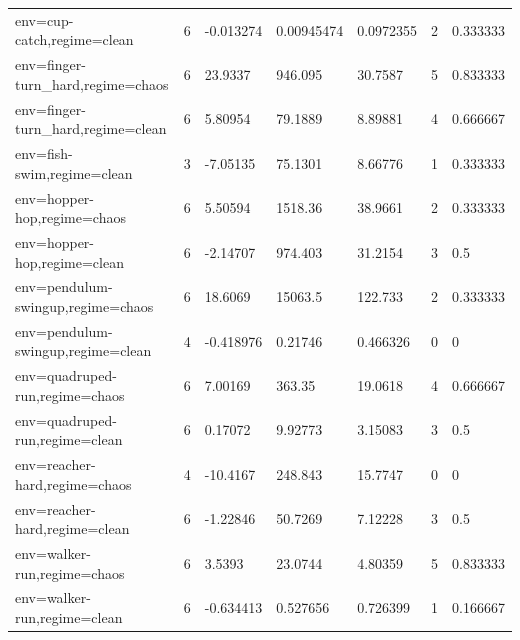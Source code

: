 \begin{tabular}{lllllll}
env=cup-catch,regime=clean & 6 & -0.013274 & 0.00945474 & 0.0972355 & 2 & 0.333333 \\
env=finger-turn\_hard,regime=chaos & 6 & 23.9337 & 946.095 & 30.7587 & 5 & 0.833333 \\
env=finger-turn\_hard,regime=clean & 6 & 5.80954 & 79.1889 & 8.89881 & 4 & 0.666667 \\
env=fish-swim,regime=clean & 3 & -7.05135 & 75.1301 & 8.66776 & 1 & 0.333333 \\
env=hopper-hop,regime=chaos & 6 & 5.50594 & 1518.36 & 38.9661 & 2 & 0.333333 \\
env=hopper-hop,regime=clean & 6 & -2.14707 & 974.403 & 31.2154 & 3 & 0.5 \\
env=pendulum-swingup,regime=chaos & 6 & 18.6069 & 15063.5 & 122.733 & 2 & 0.333333 \\
env=pendulum-swingup,regime=clean & 4 & -0.418976 & 0.21746 & 0.466326 & 0 & 0 \\
env=quadruped-run,regime=chaos & 6 & 7.00169 & 363.35 & 19.0618 & 4 & 0.666667 \\
env=quadruped-run,regime=clean & 6 & 0.17072 & 9.92773 & 3.15083 & 3 & 0.5 \\
env=reacher-hard,regime=chaos & 4 & -10.4167 & 248.843 & 15.7747 & 0 & 0 \\
env=reacher-hard,regime=clean & 6 & -1.22846 & 50.7269 & 7.12228 & 3 & 0.5 \\
env=walker-run,regime=chaos & 6 & 3.5393 & 23.0744 & 4.80359 & 5 & 0.833333 \\
env=walker-run,regime=clean & 6 & -0.634413 & 0.527656 & 0.726399 & 1 & 0.166667 \\
\bottomrule
\end{tabular}
